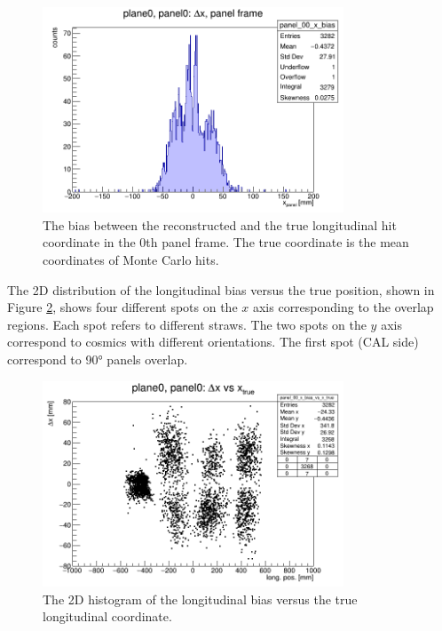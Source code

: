 \begin{figure}[!h]
    \centering
    \includegraphics[width=0.8\textwidth]{figures/png/panel_00_x_bias.png}
    \caption[The bias between the reconstructed and the true hit coordinate.]{The bias between the reconstructed 
    and the true longitudinal hit coordinate in the 0th panel frame. 
    The true coordinate is the mean coordinates of Monte Carlo hits.}
    \label{fig:bias}
\end{figure}
The 2D distribution of the longitudinal bias 
versus the true position, shown in 
Figure \ref{fig:rec2D}, shows four different 
spots on the $x$ axis corresponding to 
the overlap regions. Each spot refers to 
different straws. The two spots on the $y$ 
axis correspond to cosmics with different orientations. 
The first spot (CAL side) correspond to 90° 
panels overlap.
\begin{figure}[!h]
    \centering
    \includegraphics[width=0.8\textwidth]{figures/png/panel_00_x_bias_vs_x.png}
    \caption[The 2D histogram of the longitudinal bias versus the true coordinate.]{The 2D histogram of the longitudinal bias versus the true longitudinal coordinate.}
    \label{fig:rec2D}
\end{figure}
